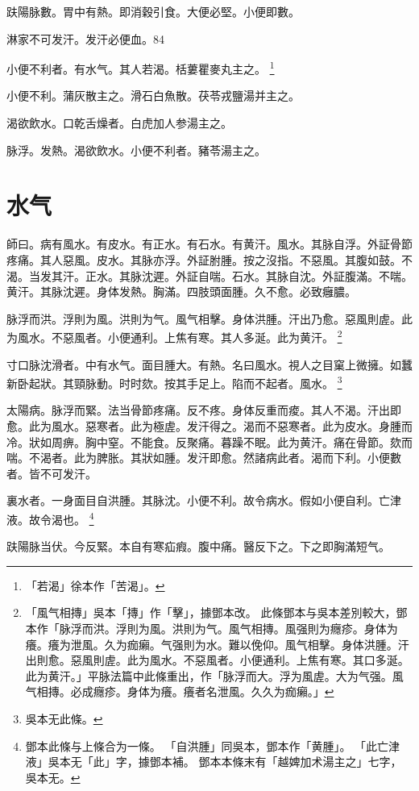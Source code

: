 趺陽脉數。胃中有熱。即消穀引食。大便必堅。小便即數。

淋家不可发汗。发汗必便血。84

小便不利者。有水气。其人若渴。栝蔞瞿麥丸主之。
	\footnote{
		「若渴」徐本作「苦渴」。
	}

小便不利。蒲灰散主之。滑石白魚散。茯苓戎鹽湯并主之。

渴欲飲水。口乾舌燥者。白虎加人参湯主之。

脉浮。发熱。渴欲飲水。小便不利者。豬苓湯主之。

\chapter{水气}

師曰。病有風水。有皮水。有正水。有石水。有黄汗。風水。其脉自浮。外証骨節疼痛。{\khaai 其人}惡風。皮水。其脉亦浮。外証胕腫。按之沒指。不惡風。其腹如鼓。不渴。当发其汗。正水。其脉沈遲。外証自喘。石水。其脉自沈。外証腹滿。不喘。黄汗。其脉沈遲。身{\khaai 体}发熱。胸滿。四肢頭面腫。久不愈。必致癰膿。

脉浮而洪。浮則为風。洪則为气。風气相擊。身体洪腫。汗出乃愈。惡風則虗。此为風水。不惡風者。小便通利。上焦有寒。其人多涎。此为黄汗。
	\footnote{
		「風气相摶」吳本「摶」作「擊」，據鄧本改。
		此條鄧本与吳本差別較大，鄧本作「脉浮而洪。浮則为風。洪則为气。風气相摶。風强則为癮疹。身体为癢。癢为泄風。久为痂癩。气强則为水。難以俛仰。風气相擊。身体洪腫。汗出則愈。惡風則虗。此为風水。不惡風者。小便通利。上焦有寒。其口多涎。此为黄汗。」平脉法篇中此條重出，作「脉浮而大。浮为風虗。大为气强。風气相摶。必成癮疹。身体为癢。癢者名泄風。久久为痂癩。」
	}

寸口脉沈滑者。中有水气。面目腫大。有熱。名曰風水。視人之目窠上微擁。如{\khaai 蠶}新卧起狀。其頸脉動。时时欬。按其手足上。陷而不起者。風水。
	\footnote{
		吳本无此條。
	}

太陽病。脉浮而緊。法当骨節疼痛。反不疼。身体反重而痠。其人不渴。汗出即愈。此为風水。惡寒者。此为極虗。发汗得之。渴而不惡寒者。此为皮水。身腫而冷。狀如周痹。胸中窒。不能食。反聚痛。暮躁不眠。此为黄汗。痛在骨節。欬而喘。不渴者。此为脾胀。其狀如腫。发汗即愈。然諸病此者。渴而下利。小便數者。皆不可发汗。

裏水者。一身面目自洪腫。其脉沈。小便不利。故令病水。假如小便自利。亡津液。故令渴也。
	\footnote{
		鄧本此條与上條合为一條。
		「自洪腫」同吳本，鄧本作「黄腫」。
		「此亡津液」吳本无「此」字，據鄧本補。
		鄧本本條末有「越婢加术湯主之」七字，吳本无。
	}

趺陽脉当伏。今反緊。本自有寒疝瘕。腹中痛。醫反下之。下之即胸滿短气。

